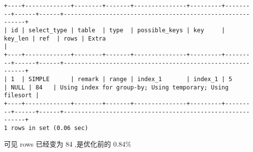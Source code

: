 \documentclass[11pt]{article}
\begin{document}
\begin{itemize}
\begin{enumerate}
\begin{enumerate}
\begin{verbatim}
+----+-------------+--------+-------+---------------+---------+---------+------+------+-----------------------------------------------------------+
| id | select_type | table  | type  | possible_keys | key     | key_len | ref  | rows | Extra                                                     |
+----+-------------+--------+-------+---------------+---------+---------+------+------+-----------------------------------------------------------+
| 1  | SIMPLE      | remark | range | index_1       | index_1 | 5       | NULL | 84   | Using index for group-by; Using temporary; Using filesort |
+----+-------------+--------+-------+---------------+---------+---------+------+------+-----------------------------------------------------------+
1 rows in set (0.06 sec)
\end{verbatim}

可见 rows 已经变为 84 ,是优化前的 0.84\%
\end{enumerate}
\end{enumerate}
\end{itemize}
\end{document}
